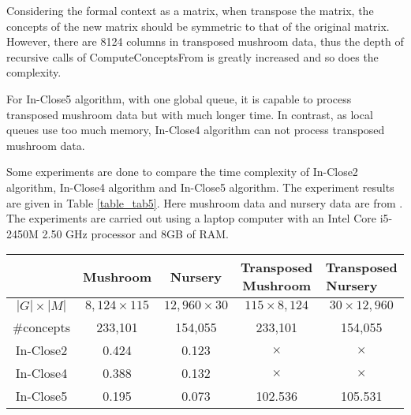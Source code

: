 \documentclass[11pt]{article}
\numberwithin{equation}{subsection}
\begin{document}
Considering the formal context as a matrix, when transpose the matrix, the concepts of the new matrix should be symmetric to that
of the original matrix. However, there are 8124 columns in transposed mushroom data, thus the depth of recursive calls of ComputeConceptsFrom is greatly increased and so does the complexity.

  For In-Close5  algorithm, with one global queue, it is capable to process transposed mushroom data but with much longer time. In contrast, as local queues use too much memory, In-Close4  algorithm can not process transposed mushroom data.

Some experiments are done  to compare the time complexity of In-Close2  algorithm, In-Close4  algorithm and In-Close5  algorithm.
The   experiment results are given in Table \ref{table_tab5}. Here mushroom data and nursery data are from \cite{Frank}.
The experiments are carried out using a laptop computer with an Intel Core i5-2450M 2.50 GHz processor and 8GB of RAM.

 \begin{table*}[ht]
            \begin{center}
                \begin{normalsize}
                    \caption{Comparison of In-Close2, In-Close4 and In-Close5}
                    \label{table_tab5}
                    \begin{tabular}
                        { c c c  c  c  }
                        \hline
                            & Mushroom       &  Nursery  &  Transposed Mushroom & Transposed Nursery        \ \  \\
                       \hline
$|G|\times |M|$ & $8,124\times 115$   & $12,960\times 30$  &  $ 115 \times  8,124$   & $30\times 12,960$       \\

\#concepts  & 233,101               &  154,055                       & 233,101            &  154,055         \\

 In-Close2 & 0.424                 & 0.123                   &  $\times$               &  $\times$         \\

In-Close4 & 0.388                  &  0.132                    &  $\times$             &  $\times$        \\

In-Close5 & 0.195                  &  0.073                     &  102.536                  &  105.531        \\
\hline
                    \end{tabular}
                \end{normalsize}
            \end{center}
        \end{table*}
\end{document}
